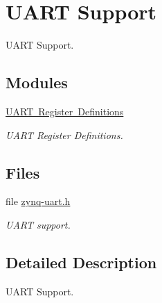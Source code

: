 \hypertarget{group__zynq__uart}{}\section{U\+A\+RT Support}
\label{group__zynq__uart}


U\+A\+RT Support.  


\subsection*{Modules}
\begin{DoxyCompactItemize}
\item 
\mbox{\hyperlink{group__zynq__uart__regs}{U\+A\+R\+T Register Definitions}}
\begin{DoxyCompactList}\small\item\em U\+A\+RT Register Definitions. \end{DoxyCompactList}\end{DoxyCompactItemize}
\subsection*{Files}
\begin{DoxyCompactItemize}
\item 
file \mbox{\hyperlink{zynq-uart_8h}{zynq-\/uart.\+h}}
\begin{DoxyCompactList}\small\item\em U\+A\+RT support. \end{DoxyCompactList}\end{DoxyCompactItemize}


\subsection{Detailed Description}
U\+A\+RT Support. 

